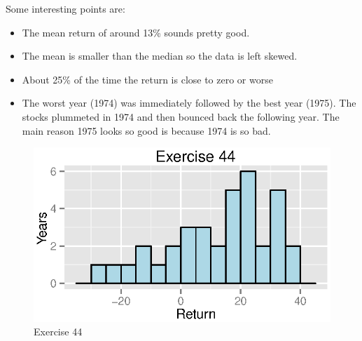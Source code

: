 \documentclass{exam}
\begin{document}
\begin{description}
        Some interesting points are:
        \begin{itemize}
          \item The mean return of around 13\% sounds pretty good.
          \item The mean is smaller than the median so the data is left skewed.
          \item About 25\% of the time the return is close to zero or worse
          \item The worst year (1974) was immediately followed by the best year
            (1975).  The stocks plummeted in 1974 and then bounced back the following
            year.  The main reason 1975 looks so good is because 1974 is so bad.   
        \end{itemize}

        \begin{figure}[H]
          \centering
          \includegraphics{figures/ex44.eps}
          \caption{Exercise 44}
        \end{figure}



\end{description}
\end{document}
